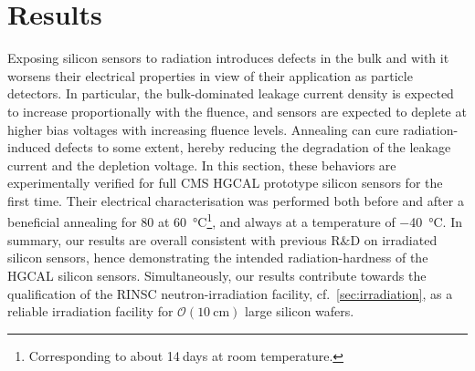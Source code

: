 \section{Results}
\label{sec:results}
Exposing silicon sensors to radiation introduces defects in the bulk and with it worsens their electrical properties in view of their application as particle detectors.
In particular, the bulk-dominated leakage current density is expected to increase proportionally with the fluence, and sensors are expected to deplete at higher bias voltages with increasing fluence levels.
Annealing can cure radiation-induced defects to some extent, hereby reducing the degradation of the leakage current and the depletion voltage.
In this section, these behaviors are experimentally verified for full CMS HGCAL prototype silicon sensors for the first time.
Their electrical characterisation was performed both before and after a beneficial annealing for \SI{80}{\min} at \SI{60}{\celsius}\footnote{Corresponding to about 14$~$days at room temperature.}, and always at a temperature of \SI{-40}{\celsius}.
In summary, our results are overall consistent with previous R$\&$D on irradiated silicon sensors, hence demonstrating the intended radiation-hardness of the HGCAL silicon sensors.
Simultaneously, our results contribute towards the qualification of the RINSC neutron-irradiation facility, cf.~\ref{sec:irradiation}, as a reliable irradiation facility for $\mathcal{O}(\SI{10}{\centi\metre})$ large silicon wafers.

